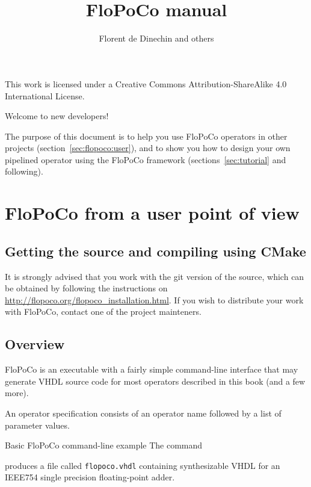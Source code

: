 \documentclass{article}
\title{
    \scalebox{0.3}{\mbox{}}\\
FloPoCo   manual
}
\author{Florent de Dinechin and others}
\begin{document}
 
\sloppy



\maketitle

\begin{center}
\begin{boxedminipage}{\textwidth}
This work is licensed under a Creative Commons Attribution-ShareAlike 4.0 International License.  
\end{boxedminipage}
\end{center}



Welcome to new developers! 

The purpose of this document is to help you use FloPoCo operators in other projects (section~\ref{sec:flopoco:user}), and to show you how to design your own pipelined operator using the FloPoCo framework (sections~\ref{sec:tutorial} and following). 

\tableofcontents



\section{FloPoCo from a user point of view\label{sec:flopoco:user}}


\subsection{Getting the source and compiling using CMake}

It is strongly advised that you work with the git version of the source, which can be obtained by following the instructions on
\url{http://flopoco.org/flopoco_installation.html}.
If you wish to distribute your work with FloPoCo, contact one of the project mainteners.

\subsection{Overview}
FloPoCo is an executable with a fairly simple command-line interface  that may generate VHDL source code for most operators described in this book (and a few more).

An operator specification consists of an operator name followed by a list of parameter values.

\begin{flopocobox}{Basic FloPoCo command-line example}
  The command
  
    produces a file called \texttt{flopoco.vhdl} containing synthesizable VHDL for an IEEE754 single precision floating-point adder.
  
\end{flopocobox}
\end{document}
